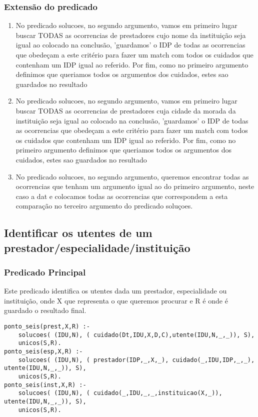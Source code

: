 \documentclass[a4paper]{report} %
\begin{document}
\subsubsection{Extensão do predicado}
\begin{enumerate}
\item No predicado solucoes, no segundo argumento, vamos em primeiro lugar buscar TODAS as ocorrencias de prestadores cujo nome da instituição seja igual ao colocado na conclusão, 'guardamos' o IDP de todas as ocorrencias que obedeçam a este critério para fazer um match com todos os cuidados que contenham um IDP igual ao referido. Por fim, como no primeiro argumento definimos que queriamos todos os argumentos dos cuidados, estes sao guardados no resultado
\item No predicado solucoes, no segundo argumento, vamos em primeiro lugar buscar TODAS as ocorrencias de prestadores cuja cidade da morada da instituição seja igual ao colocado na conclusão, 'guardamos' o IDP de todas as ocorrencias que obedeçam a este critério para fazer um match com todos os cuidados que contenham um IDP igual ao referido. Por fim, como no primeiro argumento definimos que queriamos todos os argumentos dos cuidados, estes sao guardados no resultado
\item No predicado solucoes, no segundo argumento, queremos encontrar todas as ocorrencias que tenham um argumento igual ao do primeiro argumento, neste caso a dat e colocamos todas as ocorrencias que correspondem a esta comparação no terceiro argumento do predicado soluçoes.
\end{enumerate}

\subsection{Identificar os utentes de um prestador/especialidade/instituição}

\subsubsection{Predicado Principal}
Este predicado identifica os utentes dada um prestador, especialidade ou instituição, onde X que representa o que queremos procurar e R é onde é guardado o resultado final.

\begin{verbatim}
ponto_seis(prest,X,R) :- 
    solucoes( (IDU,N), ( cuidado(Dt,IDU,X,D,C),utente(IDU,N,_,_)), S), 
    unicos(S,R).
ponto_seis(esp,X,R) :- 
    solucoes( (IDU,N), ( prestador(IDP,_,X,_), cuidado(_,IDU,IDP,_,_), utente(IDU,N,_,_)), S), 
    unicos(S,R).  
ponto_seis(inst,X,R) :- 
    solucoes( (IDU,N), ( cuidado(_,IDU,_,_,instituicao(X,_)), utente(IDU,N,_,_)), S),
    unicos(S,R).
\end{verbatim}
\end{document}

